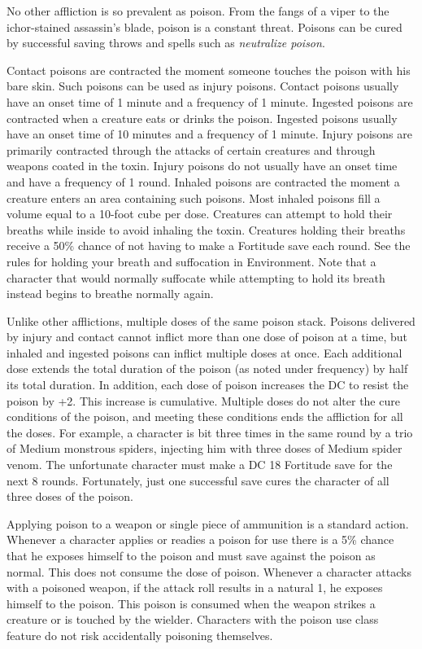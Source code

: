 				
No other affliction is so prevalent as poison. From the fangs of a viper to the ichor-stained assassin's blade, poison is a constant threat. Poisons can be cured by successful saving throws and spells such as \textit{neutralize poison}. 
				
Contact poisons are contracted the moment someone touches the poison with his bare skin. Such poisons can be used as injury poisons. Contact poisons usually have an onset time of 1 minute and a frequency of 1 minute. Ingested poisons are contracted when a creature eats or drinks the poison. Ingested poisons usually have an onset time of 10 minutes and a frequency of 1 minute. Injury poisons are primarily contracted through the attacks of certain creatures and through weapons coated in the toxin. Injury poisons do not usually have an onset time and have a frequency of 1 round. Inhaled poisons are contracted the moment a creature enters an area containing such poisons. Most inhaled poisons fill a volume equal to a 10-foot cube per dose. Creatures can attempt to hold their breaths while inside to avoid inhaling the toxin. Creatures holding their breaths receive a 50\% chance of not having to make a Fortitude save each round. See the rules for holding your breath and suffocation in Environment. Note that a character that would normally suffocate while attempting to hold its breath instead begins to breathe normally again.
				
Unlike other afflictions, multiple doses of the same poison stack. Poisons delivered by injury and contact cannot inflict more than one dose of poison at a time, but inhaled and ingested poisons can inflict multiple doses at once. Each additional dose extends the total duration of the poison (as noted under frequency) by half its total duration. In addition, each dose of poison increases the DC to resist the poison by +2. This increase is cumulative. Multiple doses do not alter the cure conditions of the poison, and meeting these conditions ends the affliction for all the doses. For example, a character is bit three times in the same round by a trio of Medium monstrous spiders, injecting him with three doses of Medium spider venom. The unfortunate character must make a DC 18 Fortitude save for the next 8 rounds. Fortunately, just one successful save cures the character of all three doses of the poison.
				
Applying poison to a weapon or single piece of ammunition is a standard action. Whenever a character applies or readies a poison for use there is a 5\% chance that he exposes himself to the poison and must save against the poison as normal. This does not consume the dose of poison. Whenever a character attacks with a poisoned weapon, if the attack roll results in a natural 1, he exposes himself to the poison. This poison is consumed when the weapon strikes a creature or is touched by the wielder. Characters with the poison use class feature do not risk accidentally poisoning themselves.
				
